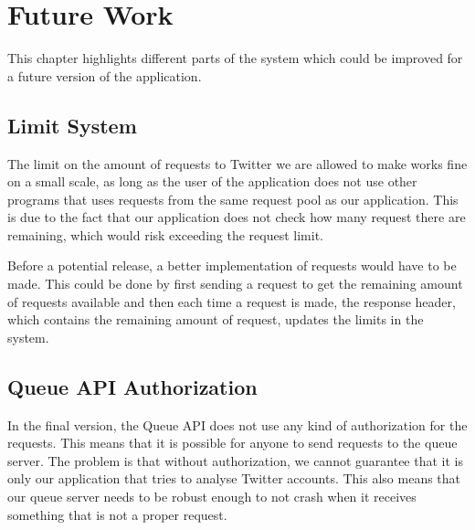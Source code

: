 \chapter{Future Work}\label{fwork}
This chapter highlights different parts of the system which could
be improved for a future version of the application.

\section{Limit System}
The limit on the amount of requests to Twitter we are allowed to make works fine
on a small scale, as long as the user of the application does not use other
programs that uses requests from the same request pool as our application. This
is due to the fact that our application does not check how many request there
are remaining, which would risk exceeding the request limit. \nl

Before a potential release, a better implementation of requests would have to be
made. This could be done by first sending a request to get the remaining amount
of requests available and then each time a request is made, the response
header, which contains the remaining amount of request, updates the
limits in the system.\nl


{}

\section{Queue API Authorization}
In the final version, the Queue API does not use any kind of authorization for
the requests. This means that it is possible for anyone to send requests to the
queue server. The problem is that without authorization, we cannot guarantee
that it is only our application that tries to analyse Twitter accounts. This
also means that our queue server needs to be robust enough to not crash when it
receives something that is not a proper request. \nl

